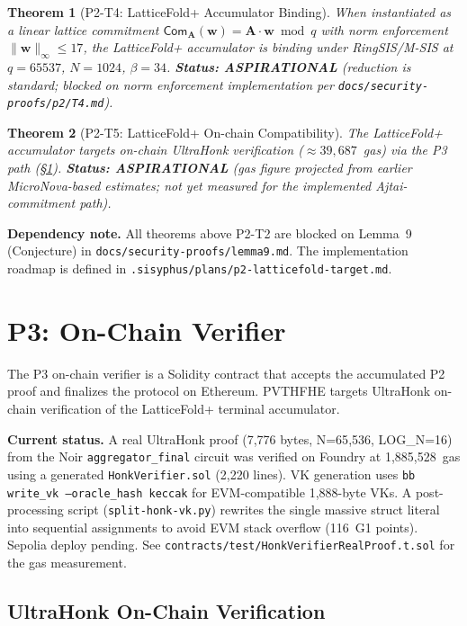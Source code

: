\documentclass{llncs}
\newtheorem{theorem}{Theorem}[section]
\begin{document}
\begin{theorem}[P2-T4: LatticeFold+ Accumulator Binding]
\label{thm:p2-t4}
When instantiated as a linear lattice commitment
$\mathsf{Com}_{\mathbf{A}}(\mathbf{w}) = \mathbf{A} \cdot \mathbf{w} \bmod q$
with norm enforcement $\|\mathbf{w}\|_\infty \leq 17$, the LatticeFold+
accumulator is binding under RingSIS/M-SIS at $q = 65537$, $N = 1024$,
$\beta = 34$.
\textbf{Status: ASPIRATIONAL} (reduction is standard; blocked on norm enforcement
implementation per \texttt{docs/security-proofs/p2/T4.md}).
\end{theorem}

\begin{theorem}[P2-T5: LatticeFold+ On-chain Compatibility]
\label{thm:p2-t5}
The LatticeFold+ accumulator targets on-chain UltraHonk verification
($\approx 39{,}687$~gas) via the P3 path (\S\ref{sec:p3}).
\textbf{Status: ASPIRATIONAL} (gas figure projected from earlier
MicroNova-based estimates; not yet measured for the implemented
Ajtai-commitment path).
\end{theorem}

\textbf{Dependency note.}  All theorems above P2-T2 are blocked
on Lemma~9 (Conjecture) in \texttt{docs/security-proofs/lemma9.md}.  The
implementation roadmap is defined in
\texttt{.sisyphus/plans/p2-latticefold-target.md}.

\section{P3: On-Chain Verifier}
\label{sec:p3}

The P3 on-chain verifier is a Solidity contract that accepts the
accumulated P2 proof and finalizes the protocol on Ethereum.
PVTHFHE targets UltraHonk on-chain verification of the LatticeFold+
terminal accumulator.

\textbf{Current status.}  A real UltraHonk proof
(7{,}776 bytes, N=65{,}536, LOG\_N=16) from the Noir
\texttt{aggregator\_final} circuit was verified on Foundry at
1{,}885{,}528~gas using a generated \texttt{HonkVerifier.sol} (2{,}220
lines).  VK generation uses \texttt{bb write\_vk --oracle\_hash keccak}
for EVM-compatible 1{,}888-byte VKs.  A post-processing script
(\texttt{split-honk-vk.py}) rewrites the single massive struct literal
into sequential assignments to avoid EVM stack overflow (116~G1 points).
Sepolia deploy pending.  See \texttt{contracts/test/HonkVerifierRealProof.t.sol}
for the gas measurement.

\subsection{UltraHonk On-Chain Verification}
\label{sec:p3-ultrahonk}
\end{document}
